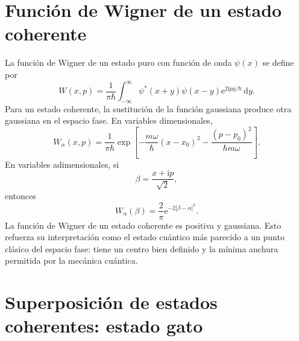 \documentclass[11pt]{article}
\newcommand{\ii}{\mathrm{i}}
\newcommand{\ee}{\mathrm{e}}
\newcommand{\dd}{\mathrm{d}}
\begin{document}
\section{Funci\'on de Wigner de un estado coherente}

La funci\'on de Wigner de un estado puro con funci\'on de onda $\psi(x)$ se
define por
\begin{equation}
  W(x,p)
  =
  \frac{1}{\pi\hbar}
  \int_{-\infty}^{\infty}
  \psi^*(x+y)\psi(x-y)\ee^{2\ii py/\hbar}\,\dd y.
\end{equation}
Para un estado coherente, la sustituci\'on de la funci\'on gaussiana produce
otra gaussiana en el espacio fase. En variables dimensionales,
\begin{equation}
  \boxed{
  W_\alpha(x,p)
  =
  \frac{1}{\pi\hbar}
  \exp\left[
  -\frac{m\omega}{\hbar}(x-x_0)^2
  -\frac{(p-p_0)^2}{\hbar m\omega}
  \right].
  }
\end{equation}
En variables adimensionales, si
\begin{equation}
  \beta=\frac{x+\ii p}{\sqrt2},
\end{equation}
entonces
\begin{equation}
  \boxed{
  W_\alpha(\beta)
  =
  \frac{2}{\pi}\ee^{-2|\beta-\alpha|^2}.
  }
\end{equation}
La funci\'on de Wigner de un estado coherente es positiva y gaussiana. Esto
refuerza su interpretaci\'on como el estado cu\'antico m\'as parecido a un
punto cl\'asico del espacio fase: tiene un centro bien definido y la m\'inima
anchura permitida por la mec\'anica cu\'antica.

\section{Superposici\'on de estados coherentes: estado gato}
\end{document}
